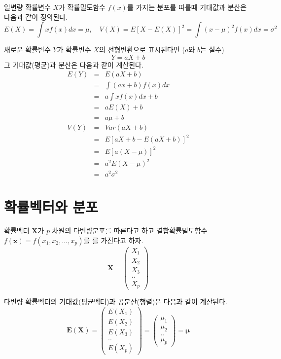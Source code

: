 \documentclass[
  10pt,
]{book}
\theoremstyle{definition}
\theoremstyle{definition}
\theoremstyle{definition}
\theoremstyle{definition}
\theoremstyle{remark}
\begin{document}
일변량 확률변수 \(X\)가 확률밀도함수 \(f(x)\)를 가지는 분포를 따를때 기대값과 분산은 다음과 같이 정의된다.
\[ E(X) = \int x f(x)  dx = \mu, \quad V(X) = E[ X-E(X)]^2=\int (x-\mu)^2 f(x) dx =\sigma^2 \]

새로운 확률변수 \(Y\)가 확률변수 \(X\)의 선형변환으로 표시된다면 (\(a\)와 \(b\)는 실수)
\[ Y = aX+b\]
그 기대값(평균)과 분산은 다음과 같이 계산된다.
\begin{eqnarray*}
E(Y) &=& E(aX+b) \\
&=& \int (ax+b) f(x) dx \\
&=& a \int x f(x) dx + b \\
&=& a E(X) + b\\
&=& a \mu + b \\
V(Y) &=& Var(aX+b) \\
&=& E[aX+b -E(aX+b)]^2 \\
&=& E[a(X-\mu)]^2 \\
&=& a^2 E(X-\mu)^2\\
&=& a^2 \sigma^2
\end{eqnarray*}

\hypertarget{uxd655uxb960uxbca1uxd130uxc640-uxbd84uxd3ec}{%
\section{확률벡터와 분포}\label{uxd655uxb960uxbca1uxd130uxc640-uxbd84uxd3ec}}

확률벡터 \(\bm X\)가 \(p\) 차원의 다변량분포를 따른다고 하고 결합확률밀도함수 \(f(\bm x) =f(x_1,x_2,\dots,x_p)\)를
를 가진다고 하자.
\begin{equation*}
\bm X =
  \begin{pmatrix}
X_1 \\
X_2 \\
X_3 \\
..  \\
X_p
\end{pmatrix}
\end{equation*}

다변량 확률벡터의 기대값(평균벡터)과 공분산(행렬)은 다음과 같이 계산된다.
\begin{equation*}
\bm E(\bm X) =
  \begin{pmatrix}
E(X_1) \\
E(X_2) \\
E(X_3) \\
..  \\
E(X_p)
\end{pmatrix}
= 
  \begin{pmatrix}
\mu_1 \\
\mu_2 \\
..  \\
\mu_p
\end{pmatrix}
=\bm \mu
\end{equation*}
\end{document}
